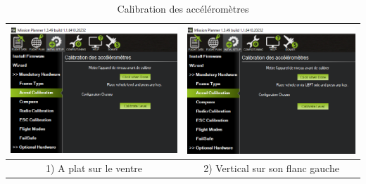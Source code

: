 	\begin{table}[H]
		\begin{center}
			
			\vspace{1cm}\caption{Calibration des accéléromètres  }
			
			\hspace*{-0.5 cm}	\begin{tabular}{|c|c|}
				\hline
				\centering
				\includegraphics[width=7.5cm]{Images/A plat sur le ventre} & \includegraphics[width=7.5cm]{Images/Vertical sur son flanc gauche}\\
				\hline
				\centering
				
				1) A plat sur le ventre & 2) Vertical sur son flanc gauche \\
				
				\hline
				

\end{tabular}
\end{center}
\end{table}
